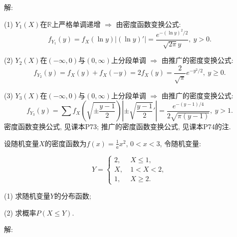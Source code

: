 \documentclass[standard]{ExBook}
\begin{document}
\begin{qitems}
\vspace{-5em}

    \begin{bbox}
解: 

(1) $Y_1(X)$在$\mathbb{R}$上严格单调递增 $\Longrightarrow$ 由密度函数变换公式:
$$f_{Y_1}(y)=f_{X}(\ln y)|(\ln y)'|=\displaystyle\frac{e^{-(\ln y)^2/2}}{\sqrt{2\pi}y},\ y>0.$$

(2) $Y_2(X)$在$(-\infty,0)$与$(0,\infty)$上分段单调 $\Longrightarrow$ 由推广的密度变换公式:
$$f_{Y_2}(y)=f_{X}(y)+f_{X}(-y)=2f_{X}(y)=\displaystyle\frac{2}{\sqrt{\pi}}e^{-y^2/2},\ y \geq 0.$$
    \end{bbox}

\vspace{-5em}

    \begin{bbox}
(3) $Y_3(X)$在$(-\infty,0)$与$(0,\infty)$上分段单调 $\Longrightarrow$ 由推广的密度变换公式:
$$f_{Y_3}(y)=\sum f_{X}(\sqrt{\pm\displaystyle\frac{y-1}{2}})\left|\pm\sqrt{\displaystyle\frac{y-1}{2}}'\right|=\displaystyle\frac{e^{-(y-1)/4}}{2\sqrt{\pi(y-1)}},\ y > 1.$$
\textcolor{themeColor}{\selectfont {} 密度函数变换公式, 见课本P73; 推广的密度函数变换公式, 见课本P74的注.}
    \end{bbox}

\vspace{-5em}

    \begin{bbox}
    \begin{shaded}
        \qitem
设随机变量$X$的密度函数为$f(x)=\frac{1}{a}x^2$, $0 < x < 3$, 令随机变量:
\vspace{-2em}
\begin{center}
\begin{equation}
    Y=
    \left\{
    \begin{array}{cl}
        \nonumber
        2,\ &X \leq 1,\\
        X,\ &1 < X < 2,\\
        1,\ &X \geq 2.
    \end{array}
    \right.
\end{equation}
\end{center}
(1) 求随机变量$Y$的分布函数;

(2) 求概率$P(X\leq Y)$.
    \end{shaded}
    \end{bbox}

\vspace{-5em}

    \begin{bbox}
解: 


\end{bbox}
\end{qitems}
\end{document}

